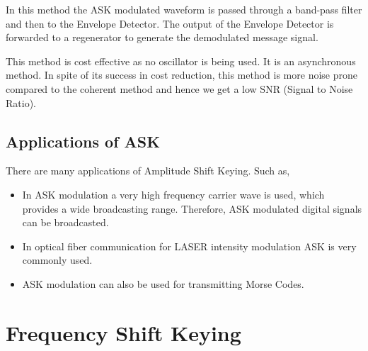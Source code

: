\documentclass{report}
\begin{document}
	\bigskip
	
	In this method the ASK modulated waveform is passed through a band-pass filter and then to the Envelope Detector. The output of the Envelope Detector is forwarded to a regenerator to generate the demodulated message signal. 
	\bigskip
	
	This method is cost effective as no oscillator is being used. It is an asynchronous method. In spite of its success in cost reduction, this method is more noise prone compared to the coherent method and hence we get a low SNR (Signal to Noise Ratio).
	
	\bigskip
	
	
	\section{Applications of ASK}
	\bigskip
	
	There are many applications of Amplitude Shift Keying. Such as,
	\begin{itemize}
		\item In ASK modulation a very high frequency carrier wave is used, which provides a wide broadcasting range. Therefore, ASK modulated digital signals can be broadcasted.
		\item In optical fiber communication for LASER intensity modulation ASK is very commonly used.
		\item ASK modulation can also be used for transmitting Morse Codes.
		
	\end{itemize}
	
	\newpage
	
	\chapter{Frequency Shift Keying}
\end{document}
